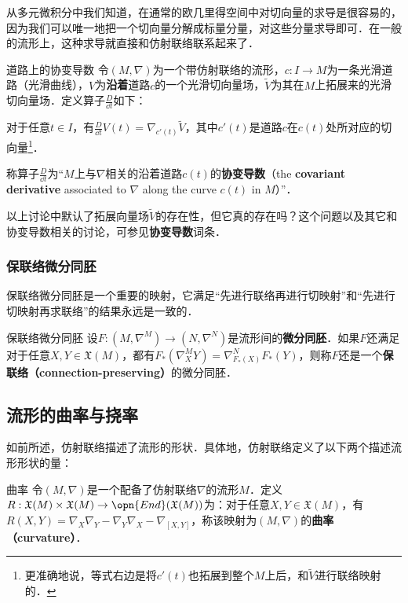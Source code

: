 从多元微积分中我们知道，在通常的欧几里得空间中对切向量的求导是很容易的，因为我们可以唯一地把一个切向量分解成标量分量，对这些分量求导即可．在一般的流形上，这种求导就直接和仿射联络联系起来了．

\begin{definition}{道路上的协变导数}
令$(M, \nabla)$为一个带仿射联络的流形，$c:I\to M$为一条光滑道路（光滑曲线），$V$为\textbf{沿着}道路$c$的一个光滑切向量场，$\tilde{V}$为其在$M$上拓展来的光滑切向量场．定义算子$\frac{D}{\dd t}$如下：

对于任意$t\in I$，有$\frac{D}{\dd t}V(t)=\nabla_{c'(t)}\tilde{V}$，其中$c'(t)$是道路$c$在$c(t)$处所对应的切向量\footnote{更准确地说，等式右边是将$c'(t)$也拓展到整个$M$上后，和$\tilde{V}$进行联络映射的．}．

称算子$\frac{D}{\dd t}$为“$M$上与$\nabla$相关的沿着道路$c(t)$的\textbf{协变导数}（the \textbf{covariant derivative} associated to $\nabla$ along the curve $c(t)$ in $M$）”．
\end{definition}

以上讨论中默认了拓展向量场$\tilde{V}$的存在性，但它真的存在吗？这个问题以及其它和协变导数相关的讨论，可参见\textbf{协变导数}词条．





\subsubsection{保联络微分同胚}

保联络微分同胚是一个重要的映射，它满足“先进行联络再进行切映射”和“先进行切映射再求联络”的结果永远是一致的．

\begin{definition}{保联络微分同胚}
设$F:(M, \nabla^M)\to (N, \nabla^N)$是流形间的\textbf{微分同胚}．如果$F$还满足对于任意$X, Y\in \mathfrak{X}(M)$，都有$F_*(\nabla^M_XY)=\nabla^N_{F_*(X)}F_*(Y)$，则称$F$还是一个\textbf{保联络（connection-preserving）}的微分同胚．
\end{definition}




\subsection{流形的曲率与挠率}

如前所述，仿射联络描述了流形的形状．具体地，仿射联络定义了以下两个描述流形形状的量：

\begin{definition}{曲率}
令$(M, \nabla)$是一个配备了仿射联络$\nabla$的流形$M$．定义$R:\mathfrak{X}(M)\times\mathfrak{X}(M)\to\opn{End}(\mathfrak{X}(M))$为：对于任意$X, Y\in\mathfrak{X}(M)$，有$R(X, Y)=\nabla_X\nabla_Y-\nabla_Y\nabla_X-\nabla_{[X, Y]}$，称该映射为$(M, \nabla)$的\textbf{曲率（curvature）}．
\end{definition}

